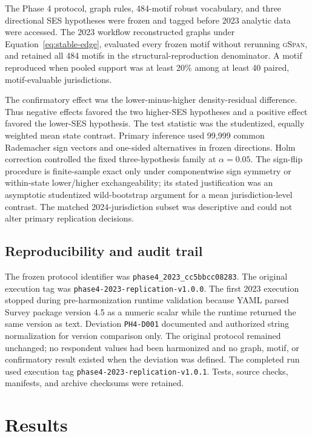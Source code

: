 \documentclass[11pt]{article}
\newcommand{\gspan}{\textsc{gSpan}}
\begin{document}
The Phase 4 protocol, graph rules, 484-motif robust vocabulary, and three
directional SES hypotheses were frozen and tagged before 2023 analytic data
were accessed. The 2023 workflow reconstructed graphs under
Equation~\ref{eq:stable-edge}, evaluated every frozen motif without rerunning
\gspan, and retained all 484 motifs in the structural-reproduction
denominator. A motif reproduced when pooled support was at least 20\% among at
least 40 paired, motif-evaluable jurisdictions.

The confirmatory effect was the lower-minus-higher density-residual
difference. Thus negative effects favored the two higher-SES hypotheses and a
positive effect favored the lower-SES hypothesis. The test statistic was the
studentized, equally weighted mean state contrast. Primary inference used
99,999 common Rademacher sign vectors and one-sided alternatives in frozen
directions. Holm correction controlled the fixed three-hypothesis family at
$\alpha=0.05$. The sign-flip procedure is finite-sample exact only under
componentwise sign symmetry or within-state lower/higher exchangeability; its
stated justification was an asymptotic studentized wild-bootstrap argument
for a mean jurisdiction-level contrast. The matched 2024-jurisdiction subset
was descriptive and could not alter primary replication decisions.

\subsection{Reproducibility and audit trail}

The frozen protocol identifier was
\texttt{phase4\_2023\_cc5bbcc08283}. The original execution tag was
\texttt{phase4-2023-replication-v1.0.0}. The first 2023 execution stopped
during pre-harmonization runtime validation because YAML parsed Survey
package version 4.5 as a numeric scalar while the runtime returned the same
version as text. Deviation \texttt{PH4-D001} documented and authorized string
normalization for version comparison only. The original protocol remained
unchanged; no respondent values had been harmonized and no graph, motif, or
confirmatory result existed when the deviation was defined. The completed run
used execution tag \texttt{phase4-2023-replication-v1.0.1}. Tests, source
checks, manifests, and archive checksums were retained.

\section{Results}
\end{document}
